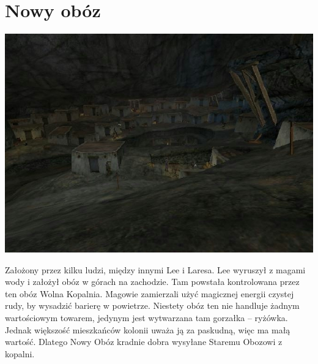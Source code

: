 \documentclass[11pt,polish, openany]{book}
\begin{document}
\section{Nowy obóz}
\begin{center}
 \includegraphics[scale=0.5]{nowyoboz.jpg}
\end{center}
Założony przez kilku ludzi, między innymi Lee i Laresa. Lee wyruszył z magami wody i założył obóz w górach na zachodzie. Tam powstała kontrolowana przez ten obóz Wolna Kopalnia. Magowie zamierzali użyć magicznej energii czystej rudy, by wysadzić barierę w powietrze. Niestety obóz ten nie handluje żadnym wartościowym towarem, jedynym jest wytwarzana tam gorzałka – ryżówka. Jednak większość mieszkańców kolonii uważa ją za paskudną, więc ma małą wartość. Dlatego Nowy Obóz kradnie dobra wysyłane Staremu Obozowi z kopalni.
\end{document}
